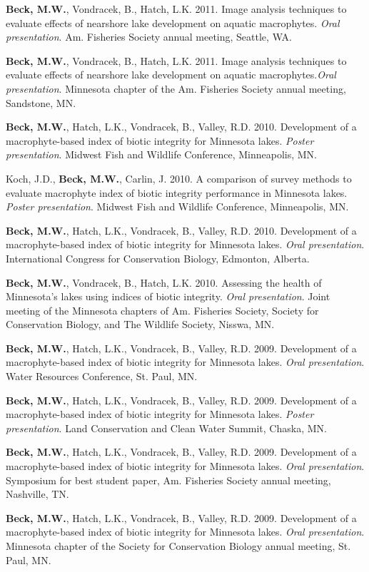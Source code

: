 \documentclass[letterpaper,12pt]{article}
\begin{document}
{\bf Beck, M.W.}, Vondracek, B., Hatch, L.K. 2011. Image analysis techniques to evaluate effects of nearshore lake development on aquatic macrophytes. \textit{Oral presentation}. Am. Fisheries Society annual meeting, Seattle, WA.

{\bf Beck, M.W.}, Vondracek, B., Hatch, L.K. 2011. Image analysis techniques to evaluate effects of nearshore lake development on aquatic macrophytes.\textit{Oral presentation}. Minnesota chapter of the Am. Fisheries Society annual meeting, Sandstone, MN.

{\bf Beck, M.W.}, Hatch, L.K., Vondracek, B., Valley, R.D. 2010. Development of a macrophyte-based index of biotic integrity for Minnesota lakes. \textit{Poster presentation}. Midwest Fish and Wildlife Conference, Minneapolis, MN.

Koch, J.D., {\bf Beck, M.W.}, Carlin, J. 2010. A comparison of survey methods to evaluate macrophyte index of biotic integrity performance in Minnesota lakes. \textit{Poster presentation}. Midwest Fish and Wildlife Conference, Minneapolis, MN.

{\bf Beck, M.W.}, Hatch, L.K., Vondracek, B., Valley, R.D. 2010. Development of a macrophyte-based index of biotic integrity for Minnesota lakes. \textit{Oral presentation}. International Congress for Conservation Biology, Edmonton, Alberta.

{\bf Beck, M.W.}, Vondracek, B., Hatch, L.K. 2010. Assessing the health of Minnesota's lakes using indices of biotic integrity. \textit{Oral presentation}. Joint meeting of the Minnesota chapters of Am. Fisheries Society, Society for Conservation Biology, and The Wildlife Society, Nisswa, MN.

{\bf Beck, M.W.}, Hatch, L.K., Vondracek, B., Valley, R.D. 2009. Development of a macrophyte-based index of biotic integrity for Minnesota lakes. \textit{Oral presentation}. Water Resources Conference, St. Paul, MN.

{\bf Beck, M.W.}, Hatch, L.K., Vondracek, B., Valley, R.D. 2009. Development of a macrophyte-based index of biotic integrity for Minnesota lakes. \textit{Poster presentation}. Land Conservation and Clean Water Summit, Chaska, MN.

{\bf Beck, M.W.}, Hatch, L.K., Vondracek, B., Valley, R.D. 2009. Development of a macrophyte-based index of biotic integrity for Minnesota lakes. \textit{Oral presentation}. Symposium for best student paper, Am. Fisheries Society annual meeting, Nashville, TN.

{\bf Beck, M.W.}, Hatch, L.K., Vondracek, B., Valley, R.D. 2009. Development of a macrophyte-based index of biotic integrity for Minnesota lakes. \textit{Oral presentation}. Minnesota chapter of the Society for Conservation Biology annual meeting, St. Paul, MN.
\end{document}
